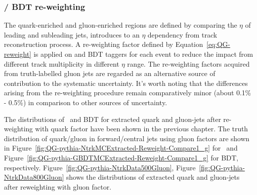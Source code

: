     \subsubsection{{\ntrk} / BDT re-weighting}
  The quark-enriched and gluon-enriched regions are defined by comparing the $\eta$ of leading and subleading jets, introduces to an $\eta$ dependency from track reconstruction process. A re-weighting factor defined by Equation~\ref{eq:QG-reweight} is applied on {\ntrk} and BDT taggers for each event to reduce the impact from different track multiplicity in different $\eta$ range. The re-weighting factors acquired from truth-labelled gluon jets are regarded as an alternative source of contribution to the systematic uncertainty. It's worth noting that the differences arising from the re-weighting procedure remain comparatively minor (about 0.1\% - 0.5\%) in comparison to other sources of uncertainty.
  
  
  The distributions of \ntrk~and BDT for extracted quark and gluon-jets after re-weighting with quark factor have been shown in the previous chapter. The truth distribution of quark/gluon in forward/central jets using gluon factors are shown in Figure~\ref{fig:QG-pythia-NtrkMCExtracted-Reweight-Compare1_g} for \ntrk~and Figure~\ref{fig:QG-pythia-GBDTMCExtracted-Reweight-Compare1_g} for BDT, respectively.  Figure~\ref{fig:QG-pythia-NtrkData500Gluon},  Figure~\ref{fig:QG-pythia-NtrkData800Gluon} shows the distributions of extracted quark and gluon-jets after reweighting with gluon factor.
  
  
  
